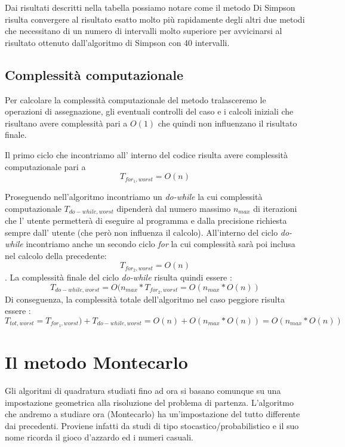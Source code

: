 \documentclass{article}
\begin{document}
\hfill

Dai risultati descritti nella tabella possiamo notare come il metodo Di Simpson risulta convergere al risultato esatto molto più rapidamente degli altri due metodi che necessitano di un numero di intervalli molto superiore per avvicinarsi al risultato ottenuto dall'algoritmo di Simpson con 40 intervalli.

\subsection{Complessità computazionale}

Per calcolare la complessità computazionale del metodo tralasceremo le operazioni di assegnazione, gli eventuali controlli del caso e i calcoli iniziali che risultano avere complessità pari a $O(1)$ che quindi non influenzano il risultato finale.

Il primo ciclo che incontriamo all' interno del codice risulta avere complessità computazionale pari a \[T_{for_1,worst} = O(n)\]

Proseguendo nell'algoritmo incontriamo un \textit{do-while} la cui complessità computazionale $T_{do-while,worst}$ dipenderà dal numero massimo $n_{max}$ di iterazioni che l' utente permetterà di eseguire al programma e dalla precisione richiesta sempre dall' utente (che però non influenza il calcolo). All'interno del ciclo \textit{do-while} incontriamo anche un secondo ciclo \textit{for} la cui complessità sarà poi inclusa nel calcolo della precedente: \[T_{for_2,worst} = O(n)\]. La complessità finale del ciclo \textit{do-while} risulta quindi essere : \[T_{do-while,worst} = O(n_{max}*T_{for_2,worst} = O(n_{max}*O(n))\]
Di conseguenza, la complessità totale dell'algoritmo nel caso peggiore risulta essere : \[T_{tot,worst} = T_{for_1,worst})+T_{do-while,worst} = O(n)+O(n_{max}*O(n)) =O(n_{max}*O(n))\]

\newpage

\section{Il metodo Montecarlo}
Gli algoritmi di quadratura studiati fino ad ora si basano comunque su una impostazione geometrica alla risoluzione del problema di partenza. L'algoritmo che andremo a studiare ora (Montecarlo) ha un’impostazione del tutto differente dai precedenti. Proviene infatti da studi di tipo stocastico/probabilistico e il suo nome ricorda il gioco d’azzardo ed i numeri casuali.
\end{document}

